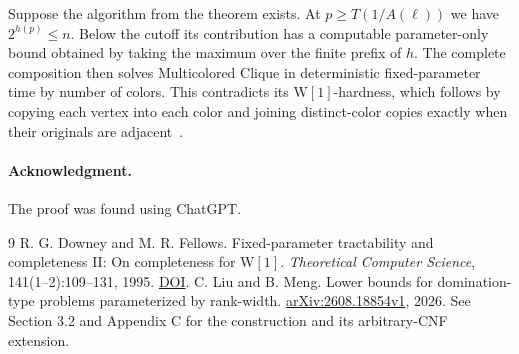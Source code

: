 \documentclass[11pt]{article}
\begin{document}
Suppose the algorithm from the theorem exists. At
$p\ge T(1/A(\ell))$ we have $2^{h(p)}\le n$. Below the cutoff its
contribution has a computable parameter-only bound obtained by taking the
maximum over the finite prefix of $h$. The complete composition then
solves Multicolored Clique in deterministic fixed-parameter time by
number of colors. This contradicts its $\mathrm W[1]$-hardness, which
follows by copying each vertex into each color and joining distinct-color
copies exactly when their originals are adjacent~\cite{df}.

\paragraph{Acknowledgment.}
The proof was found using ChatGPT.

\begin{thebibliography}{9}
R. G. Downey and M. R. Fellows.
Fixed-parameter tractability and completeness II: On completeness for
$\mathrm W[1]$. \emph{Theoretical Computer Science}, 141(1--2):109--131,
1995. \href{https://doi.org/10.1016/0304-3975(94)00097-3}{DOI}.
C. Liu and B. Meng.
Lower bounds for domination-type problems parameterized by rank-width.
\href{https://arxiv.org/abs/2608.18854v1}{arXiv:2608.18854v1}, 2026.
See Section 3.2 and Appendix C for the construction and its arbitrary-CNF extension.
\end{thebibliography}
\end{document}
